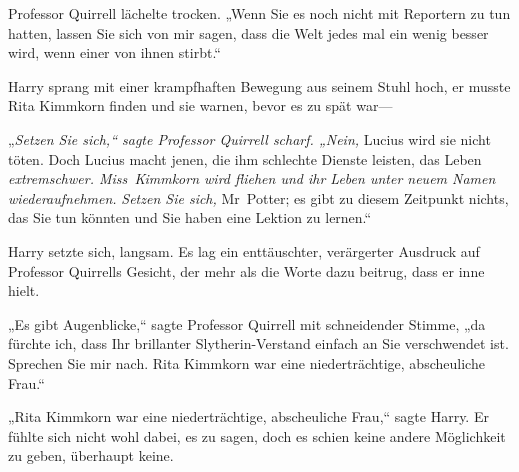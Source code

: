 {%
Professor Quirrell lächelte trocken. „Wenn Sie es noch nicht mit Reportern zu tun hatten, lassen Sie sich von mir sagen, dass die Welt jedes mal ein wenig besser wird, wenn einer von ihnen stirbt.“

Harry sprang mit einer krampfhaften Bewegung aus seinem Stuhl hoch, er musste Rita Kimmkorn finden und sie warnen, bevor es zu spät war—

„\emph{Setzen Sie sich,“ sagte Professor Quirrell scharf. „Nein,} Lucius wird sie nicht töten. Doch Lucius macht jenen, die ihm schlechte Dienste leisten, das Leben \emph{extremschwer. Miss~Kimmkorn wird fliehen und ihr Leben unter neuem Namen wiederaufnehmen.} \emph{Setzen Sie sich,} Mr~Potter; es gibt zu diesem Zeitpunkt nichts, das Sie tun könnten und Sie haben eine Lektion zu lernen.“

Harry setzte sich, langsam. Es lag ein enttäuschter, verärgerter Ausdruck auf Professor Quirrells Gesicht, der mehr als die Worte dazu beitrug, dass er inne hielt.

„Es gibt Augenblicke,“ sagte Professor Quirrell mit schneidender Stimme, „da fürchte ich, dass Ihr brillanter Slytherin-Verstand einfach an Sie verschwendet ist. Sprechen Sie mir nach. Rita Kimmkorn war eine niederträchtige, abscheuliche Frau.“

„Rita Kimmkorn war eine niederträchtige, abscheuliche Frau,“ sagte Harry. Er fühlte sich nicht wohl dabei, es zu sagen, doch es schien keine andere Möglichkeit zu geben, überhaupt keine.

}
